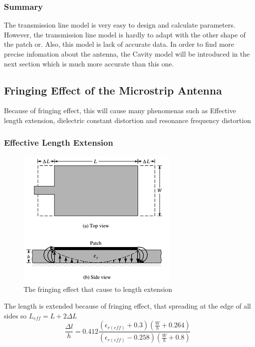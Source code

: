 \documentclass[11pt,a4paper,hidelinks]{article}
\begin{document}
        \subsubsection{Summary}
        \indent The transmission line model is very easy to design and calculate parameters. However, the transmission line
                model is hardly to adapt with the other shape of the patch or. Also, this model is lack of accurate data.
                In order to find more precise infomation about the antenna, the Cavity model will be introduced 
                in the next section which is much more accurate than this one.\cite{CaM:81,NoK:05}
      
  \newpage

  \subsection{Fringing Effect of the Microstrip Antenna}
    \indent Because of fringing effect, this will cause many phenomenas such as Effective length extension, 
            dielectric constant distortion and resonance frequency distortion\cite{CoB:05}
    
    \subsubsection{Effective Length Extension}
      \begin{figure}[ht]
        \includegraphics{fringingeffect.png}
        \centering
        \caption{The fringing effect that cause to length extension}
      \end{figure}
      \indent The length is extended because of fringing effect, that spreading at the edge of all sides so
              $L_{eff} = L + 2\Delta L$\cite{CoB:05} 
      \begin{equation}
        \frac{\Delta l}{h}=0.412\frac{(\epsilon_{r(eff)}+0.3)(\frac{W}{h} + 0.264)}{(\epsilon_{r(eff)}-0.258)(\frac{W}{h} + 0.8)}
      \end{equation}
\end{document}
